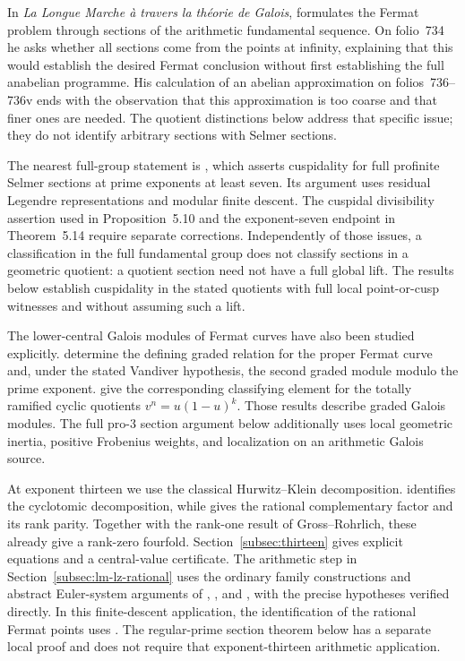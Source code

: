 \documentclass[11pt]{article}
\numberwithin{equation}{section}
\theoremstyle{definition}
\begin{document}
In \emph{La Longue Marche \`a travers la th\'eorie de Galois},
\citet[\S51.16, fols.~733--736v]{Grothendieck1981} formulates the
Fermat problem through sections of the arithmetic fundamental sequence.
On folio~734 he asks whether all sections come from the points at
infinity, explaining that this would establish the desired Fermat
conclusion without first establishing the full anabelian programme.
His calculation of an abelian approximation on folios~736--736v ends
with the observation that this approximation is too coarse and that
finer ones are needed. The quotient distinctions below address that
specific issue; they do not identify arbitrary sections with Selmer
sections.

The nearest full-group statement is
\citet[Theorem~A and \S5]{Steklov2026}, which asserts cuspidality for
full profinite Selmer sections at prime exponents at least seven.
Its argument uses residual Legendre representations and modular
finite descent. The cuspidal divisibility assertion used in
Proposition~5.10 and the exponent-seven endpoint in Theorem~5.14
require separate corrections. Independently of those issues, a
classification in the full fundamental group does not classify
sections in a geometric quotient: a quotient section need not have
a full global lift. The results below establish cuspidality in the
stated quotients with full local point-or-cusp witnesses and without
assuming such a lift.

The lower-central Galois modules of Fermat curves have also been studied
explicitly. \citet[Theorem~1.1 and Corollary~1.2; author version,
pp.~2--3]{DavisPriesWickelgren2024} determine the defining graded
relation for the proper Fermat curve and, under the stated Vandiver
hypothesis, the second graded module modulo the prime exponent.
\citet[Theorem~A, equivalently Theorem~3.5]{DuqueRoseroPries2024}
give the corresponding classifying element for the totally ramified
cyclic quotients $v^n=u(1-u)^k$.
Those results describe graded Galois modules. The full pro-$3$ section
argument below additionally uses local geometric inertia, positive
Frobenius weights, and localization on an arithmetic Galois source.

At exponent thirteen we use the classical Hurwitz--Klein decomposition.
\citet[Theorem~6.2 and Corollary~6.3, pp.~89--90]{Lim1992}
identifies the cyclotomic decomposition, while
\citet[Proposition~2.1 and Corollary~2.2, p.~942]{Tzermias2004}
gives the rational complementary factor and its rank parity.
Together with the rank-one result of Gross--Rohrlich, these already
give a rank-zero fourfold. Section~\ref{subsec:thirteen} gives explicit
equations and a central-value certificate. The arithmetic step in
Section~\ref{subsec:lm-lz-rational} uses the ordinary family constructions
and abstract Euler-system arguments of \citet{LoefflerZerbes2025},
\citet{LoefflerRockwoodZerbes2024}, and \citet{LoefflerZerbes2026},
with the precise \citet{MazurRubin2004} hypotheses verified directly.
In this finite-descent application, the identification of the rational
Fermat points uses
\citet[Theorem~0.5, p.~448]{Wiles1995}. The regular-prime section theorem
below has a separate local proof and does not require that
exponent-thirteen arithmetic application.
\end{document}
